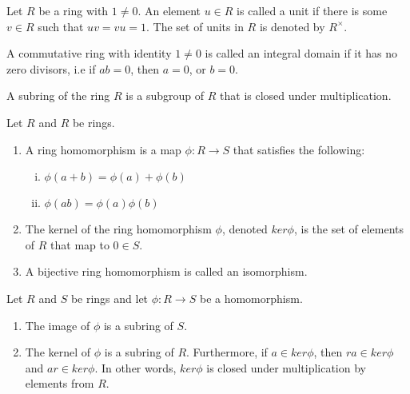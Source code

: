 \begin{defn}[Unit]
  Let $R$ be a ring with $1 \neq 0$. An element $u \in R$ is called a unit if
  there is some $v \in R$ such that $uv=vu=1$. The set of units in $R$ is
  denoted by $R^\times$.
\end{defn}


\begin{defn}
  A commutative ring with identity $1 \neq 0$ is called an integral domain if it
  has no zero divisors, i.e if $ab=0$, then $a=0$, or $b=0$.
\end{defn}


\begin{defn}[Subring]
  A subring of the ring $R$ is a subgroup of $R$ that is closed under
  multiplication.
\end{defn}


\begin{defn}
  Let $R$ and $R$ be rings. 
  \begin{enumerate}
    \item A ring homomorphism is a map $\phi: R \rightarrow S$ that satisfies
    the following:
    \begin{enumerate}[(i)]
      \item $\phi(a+b) = \phi(a) + \phi(b)$
      \item $\phi(ab) = \phi(a) \phi(b)$
    \end{enumerate}
    
    \item The kernel of the ring homomorphism $\phi$, denoted $ker\phi$, is the
    set of elements of $R$ that map to $0 \in S$.
    \item A bijective ring homomorphism is called an isomorphism.
  \end{enumerate}  
\end{defn}


\begin{defn}
\end{defn}


\begin{prop}
  Let $R$ and $S$ be rings and let $\phi: R \rightarrow S$ be a homomorphism.
  \begin{enumerate}
    \item The image of $\phi$ is a subring of $S$.
    \item The kernel of $\phi$ is a subring of $R$. Furthermore, if 
    $a \in ker\phi$, then $ra \in ker\phi$ and $ar \in ker\phi$. In other words,
    $ker\phi$ is closed under multiplication by elements from $R$.
  \end{enumerate}
\end{prop}

